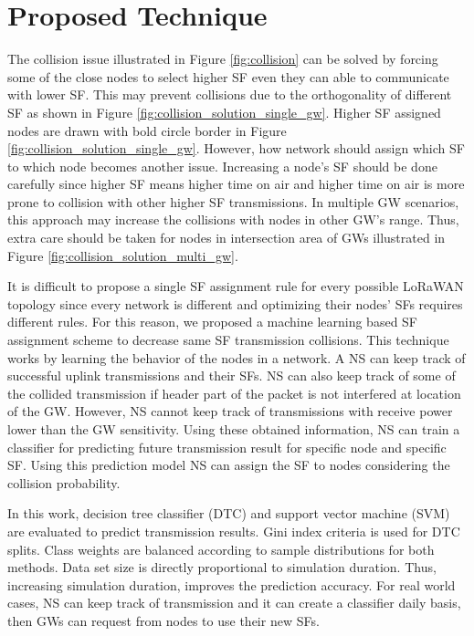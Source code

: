 \documentclass[conference]{IEEEtran}
\begin{document}
\section{Proposed Technique} \label{Proposed Technique}
\par The collision issue illustrated in Figure \ref{fig:collision} can be solved by forcing some of the close nodes to select higher SF even they can able to communicate with lower SF. This may prevent collisions due to the orthogonality of different SF as shown in Figure \ref{fig:collision_solution_single_gw}. Higher SF assigned nodes are drawn with bold circle border in Figure \ref{fig:collision_solution_single_gw}. However, how network should assign which SF to which node becomes another issue. Increasing a node's SF should be done carefully since higher SF means higher time on air and higher time on air is more prone to collision with other higher SF transmissions. In multiple GW scenarios, this approach may increase the collisions with nodes in other GW's range. Thus, extra care should be taken for nodes in intersection area of GWs illustrated in Figure \ref{fig:collision_solution_multi_gw}.

\par It is difficult to propose a single SF assignment rule for every possible LoRaWAN topology since every network is different and optimizing their nodes' SFs requires different rules. For this reason, we proposed a machine learning based SF assignment scheme to decrease same SF transmission collisions. This technique works by learning the behavior of the nodes in a network. A NS can keep track of successful uplink transmissions and their SFs. NS can also keep track of some of the collided transmission if header part of the packet is not interfered at location of the GW. However, NS cannot keep track of transmissions with receive power lower than the GW sensitivity. Using these obtained information, NS can train a classifier for predicting future transmission result for specific node and specific SF. Using this prediction model NS can assign the SF to nodes considering the collision probability.

\par In this work, decision tree classifier (DTC) and support vector machine (SVM) are evaluated to predict transmission results. Gini index criteria is used for DTC splits. Class weights are balanced according to sample distributions for both methods. Data set size is directly proportional to simulation duration. Thus, increasing simulation duration, improves the prediction accuracy. For real world cases, NS can keep track of transmission and it can create a classifier daily basis, then GWs can request from nodes to use their new SFs.
\end{document}
